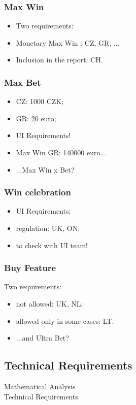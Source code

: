 \documentclass{beamer}
\begin{document}
\begin{frame}
\frametitle{Max Win}
\begin{itemize}
\item<1-> Two requirements:
\item<2-> Monetary Max Win : CZ, GR, ...
\item<3-> Inclusion in the report: CH.
\end{itemize}
\end{frame}

\begin{frame}
\frametitle{Max Bet}
\begin{itemize}
\item<1-> CZ: 1000 CZK;
\item<2-> GR: 20 euro;
\item<3-> UI Requirements!
\item<4-> Max Win GR: 140000 euro...
\item<5-> ...Max Win x Bet?
\end{itemize}
\end{frame}

\begin{frame}
\frametitle{Win celebration}
\begin{itemize}
\item<1-> UI Requirements;
\item<2-> regulation: UK, ON;
\item<3-> to check with UI team!
\end{itemize}
\end{frame}

\begin{frame}
\frametitle{Buy Feature}
Two requirements:
\begin{itemize}
\item<2-> not allowed: UK, NL;
\item<3-> allowed only in some cases: LT.
\item<4-> ...and Ultra Bet?
\end{itemize}
\end{frame}

\begin{frame}
\section{Technical Requirements}
\centering \Large Mathematical Analysis \\ \large Technical Requirements
\end{frame}
\end{document}
